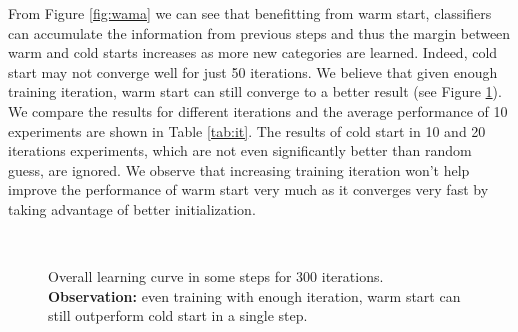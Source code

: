 From Figure \ref{fig:wama} we can see that benefitting from warm start, classifiers can accumulate the information from previous steps and thus the margin between warm and cold starts increases as more new categories are learned. Indeed, cold start may not converge well for just 50 iterations. We believe that given enough training iteration, warm start can still converge to a better result (see Figure \ref{fig:errdiff}). We compare the results for different iterations and the average performance of 10 experiments are shown in Table \ref{tab:it}. The results of cold start in 10 and 20 iterations experiments, which are not even significantly better than random guess, are ignored. We observe that increasing training iteration won't help improve the performance of warm start very much as it converges very fast by taking advantage of better initialization.
\begin{figure}[htbp]
\centering
{}
\\
\caption{Overall learning curve in some steps for 300 iterations. \textbf{Observation:} even training with enough iteration, warm start can still outperform cold start in a single step.}
\label{fig:errdiff}
\end{figure}
